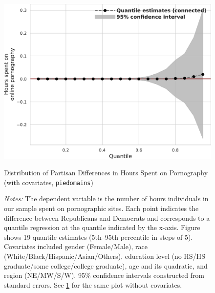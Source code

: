 \documentclass[12pt,twoside]{article}
\begin{document}
\begin{figure}[ht]
	\centering
	\includegraphics[width=.6\linewidth]{figs/quantile_reg_covariates_duration_adult.pdf}
	\caption{Distribution of Partisan Differences in Hours Spent on Pornography (with covariates, \texttt{piedomains})}
	\caption*{\footnotesize \emph{Notes:} 
		The dependent variable is the number of hours individuals in our sample spent on pornographic sites.
		Each point indicates the difference between Republicans and Democrats and corresponds to a quantile regression at the quantile indicated by the x-axis.
  Figure shows 19 quantile estimates (5th--95th percentile in steps of 5).
		Covariates included gender (Female/Male), race (White/Black/Hispanic/Asian/Others), education level (no HS/HS graduate/some college/college graduate), age and its quadratic, and region (NE/MW/S/W).
		95\% confidence intervals constructed from standard errors.
		See \cref{fig:piedomains_quantile_regression_duration_covariates} for the same plot without covariates.
	}
	\label{fig:piedomains_quantile_regression_duration_covariates}
\end{figure}



\FloatBarrier
\clearpage
\end{document}
